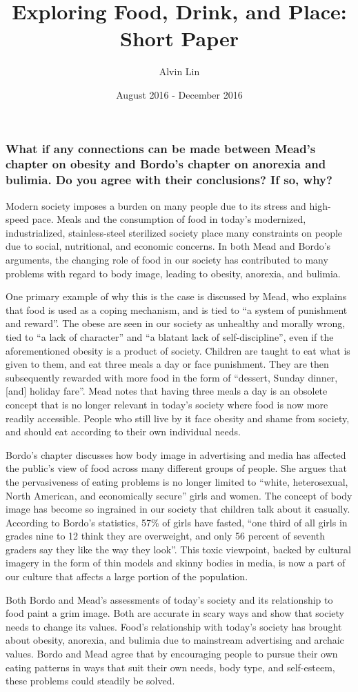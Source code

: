 \documentclass{article}
\title{Exploring Food, Drink, and Place: Short Paper}
\author{Alvin Lin}
\date{August 2016 - December 2016}
\begin{document}
\maketitle

\subsubsection*{What if any connections can be made between Mead's chapter on
obesity and Bordo's chapter on anorexia and bulimia. Do you agree with their conclusions? If so, why?}

Modern society imposes a burden on many people due to its stress and high-speed
pace. Meals and the consumption of food in today's modernized, industrialized,
stainless-steel sterilized society place many constraints on people due to
social, nutritional, and economic concerns. In both Mead and Bordo's arguments,
the changing role of food in our society has contributed to many problems
with regard to body image, leading to obesity, anorexia, and bulimia. \par
One primary example of why this is the case is discussed by Mead, who explains
that food is used as a coping mechanism, and is tied to ``a system of punishment
and reward''. The obese are seen in our society as unhealthy and morally wrong,
tied to ``a lack of character'' and ``a blatant lack of self-discipline'', even
if the aforementioned obesity is a product of society. Children are taught to
eat what is given to them, and eat three meals a day or face punishment. They
are then subsequently rewarded with more food in the form of ``dessert, Sunday
dinner, [and] holiday fare''. Mead notes that having three meals a day is an
obsolete concept that is no longer relevant in today's society where food is
now more readily accessible. People who still live by it face obesity and shame
from society, and should eat according to their own individual needs. \par
Bordo's chapter discusses how body image in advertising and media has affected
the public's view of food across many different groups of people. She argues
that the pervasiveness of eating problems is no longer limited to ``white,
heterosexual, North American, and economically secure'' girls and women. The
concept of body image has become so ingrained in our society that children
talk about it casually. According to Bordo's statistics, 57\% of girls have
fasted, ``one third of all girls in grades nine to 12 think they are overweight,
and only 56 percent of seventh graders say they like the way they look''. This
toxic viewpoint, backed by cultural imagery in the form of thin models and
skinny bodies in media, is now a part of our culture that affects a large
portion of the population. \par
Both Bordo and Mead's assessments of today's society and its relationship to
food paint a grim image. Both are accurate in scary ways and show that society
needs to change its values. Food's relationship with today's society has
brought about obesity, anorexia, and bulimia due to mainstream advertising and
archaic values. Bordo and Mead agree that by encouraging people to pursue their
own eating patterns in ways that suit their own needs, body type, and
self-esteem, these problems could steadily be solved.
\end{document}
